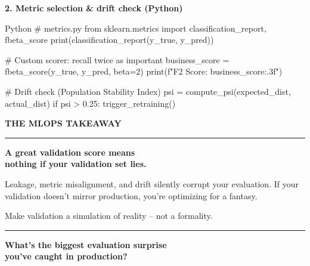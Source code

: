 \documentclass[11pt]{article}
\begin{document}
\vspace{0.15in}

\textbf{2. Metric selection \& drift check (Python)}

\begin{codebox}{Python}
# metrics.py
from sklearn.metrics import classification_report, fbeta_score
print(classification_report(y_true, y_pred))

# Custom scorer: recall twice as important
business_score = fbeta_score(y_true, y_pred, beta=2)
print(f"F2 Score: {business_score:.3f}")

# Drift check (Population Stability Index)
psi = compute_psi(expected_dist, actual_dist)
if psi > 0.25:
    trigger_retraining()
\end{codebox}

\vfill
\newpage


\vspace*{0.35in}

\begin{center}

{\fontsize{14}{16}\selectfont\color{brandblue}\textbf{THE MLOPS TAKEAWAY}}

\vspace{0.3in}

\begin{minipage}{0.88\textwidth}
\centering

{\color{brandblue}\rule{6cm}{1pt}}

\vspace{0.2in}

{\fontsize{24}{28}\selectfont\bfseries\color{brandnavy}
A great validation score means\\[0.1in]
nothing if your validation set lies.
}

\vspace{0.15in}

{\fontsize{12}{14}\selectfont\color{brandgray}
Leakage, metric misalignment, and drift silently corrupt your evaluation. If your validation doesn't mirror production, you're optimizing for a fantasy.

\vspace{0.1in}
Make validation a simulation of reality – not a formality.
}

\vspace{0.2in}

{\color{brandblue}\rule{6cm}{1pt}}

\vspace{0.3in}

{\fontsize{14}{16}\selectfont\bfseries\color{brandnavy}
What's the biggest evaluation surprise\\
you've caught in production?
}

\end{minipage}

\end{center}
\end{document}
